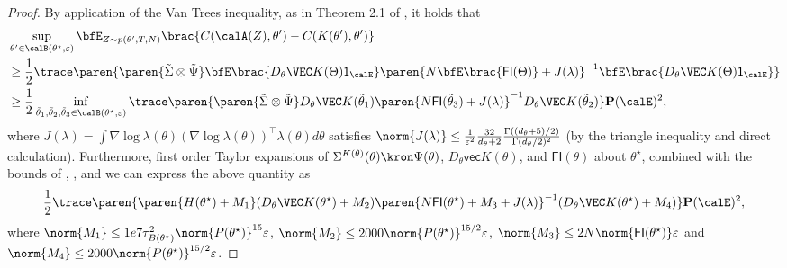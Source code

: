 \begin{proof}
By application of the Van Trees inequality, as in Theorem 2.1 of \citet{lee2023fundamental}, it holds that 
\begin{align*}
    &\sup_{\theta'\in\calB(\theta^\star, \varepsilon)} \bfE_{Z \sim p(\theta', T, N)} \brac{C(\calA(Z), \theta') -C(K(\theta'), \theta') } \\
    &\geq \frac{1}{2} \trace\paren{ \paren{\tilde \Sigma \otimes \tilde \Psi}  \bfE \brac{D_{\theta} \VEC K(\Theta) \mathsf{1}_{\calE}} \paren{N\bfE\brac{\mathsf{FI}(\Theta)} + J(\lambda)}^{-1} \bfE \brac{D_{\theta} \VEC K(\Theta) \mathsf{1}_{\calE}} } \\
    &\geq \frac{1}{2} \inf_{\tilde \theta_1, \tilde \theta_2, \tilde\theta_3 \in \calB(\theta^\star, \varepsilon)} \trace\paren{ \paren{\tilde \Sigma \otimes \tilde \Psi}  D_{\theta} \VEC K(\tilde \theta_1)  \paren{N\mathsf{FI}(\tilde \theta_3) + J(\lambda)}^{-1} D_{\theta} \VEC K(\tilde \theta_2)}  \mathbf{P}(\calE)^2,
\end{align*}
where $J(\lambda) = \int \nabla \log \lambda(\theta) (\nabla \log \lambda(\theta))^\top \lambda(\theta) d\theta$ satisfies $\norm{J(\lambda)} \leq \frac{1}{\varepsilon^2} \frac{32}{d_\theta+2} \frac{\Gamma((d_\theta+5)/2)}{\Gamma(d_{\theta}/2)^2}$ (by the triangle inequality and direct calculation). Furthermore, first order Taylor expansions of $\Sigma^{K(\theta)}(\theta)\kron \Psi(\theta)$, $D_\theta \mathsf{vec} K(\theta)$, and $\mathsf{FI}(\theta)$ about $\theta^\star$, combined with the bounds of , , and  we can express the above quantity as
\begin{align}\label{eq: lb perturbation}
    \frac{1}{2}  \trace\paren{ \paren{H(\theta^\star) + M_1}  (D_{\theta} \VEC K( \theta^\star) + M_2)  \paren{N\mathsf{FI}(\theta^\star) +  M_3+ J(\lambda)}^{-1} (D_{\theta} \VEC K(\theta^\star) + M_4)}  \mathbf{P}(\calE)^2,
\end{align} 
\sloppy where $\norm{M_1} \leq 1e7 \tau_{B(\theta^\star)}^2 \norm{P(\theta^\star)}^{15} \varepsilon$, $\norm{M_2} \leq 2000 \norm{P(\theta^\star)}^{15/2} \varepsilon$, $\norm{M_3} \leq  2N \norm{\mathsf{FI}(\theta^\star)} \varepsilon$ and $\norm{M_4} \leq 2000 \norm{P(\theta^\star)}^{15/2} \varepsilon$.


\end{proof}
